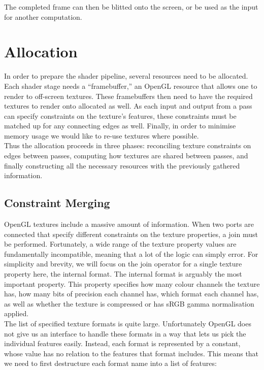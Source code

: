 \documentclass[format=sigconf]{acmart}
\begin{document}
The completed frame can then be blitted onto the screen, or be used as the input for another computation.

\section{Allocation}\label{allocation}
In order to prepare the shader pipeline, several resources need to be allocated. Each shader stage needs a ``framebuffer,'' an OpenGL resource that allows one to render to off-screen textures. These framebuffers then need to have the required textures to render onto allocated as well. As each input and output from a pass can specify constraints on the texture's features, these constraints must be matched up for any connecting edges as well. Finally, in order to minimise memory usage we would like to re-use textures where possible. \\

Thus the allocation proceeds in three phases: reconciling texture constraints on edges between passes, computing how textures are shared between passes, and finally constructing all the necessary resources with the previously gathered information.

\subsection{Constraint Merging}\label{texture-constraints}
OpenGL textures include a massive amount of information.\cite{texparameter}\cite{teximage2d} When two ports are connected that specify different constraints on the texture properties, a join must be performed. Fortunately, a wide range of the texture property values are fundamentally incompatible, meaning that a lot of the logic can simply error. For simplicity and brevity, we will focus on the join operator for a single texture property here, the internal format. The internal format is arguably the most important property. This property specifies how many colour channels the texture has, how many bits of precision each channel has, which format each channel has, as well as whether the texture is compressed or has sRGB gamma normalisation applied. \\

The list of specified texture formats is quite large.\cite{texinternalformat} Unfortunately OpenGL does not give us an interface to handle these formats in a way that lets us pick the individual features easily. Instead, each format is represented by a constant, whose value has no relation to the features that format includes. This means that we need to first destructure each format name into a list of features: \\
\end{document}
